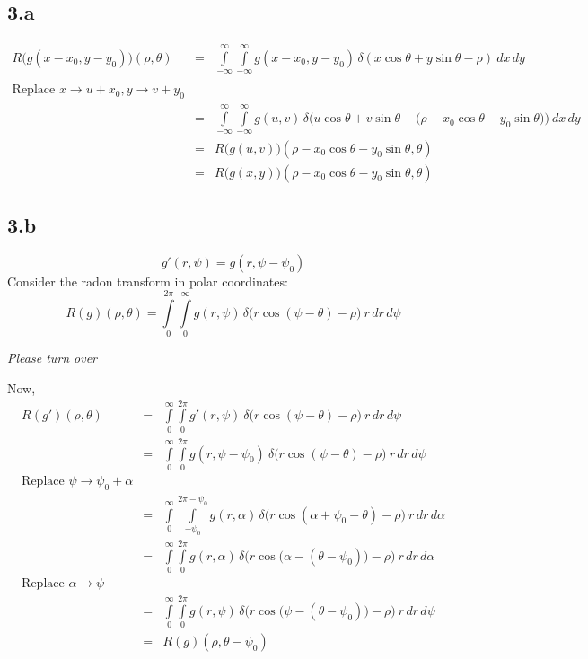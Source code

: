 \documentclass[12pt]{article}
\begin{document}
\subsection*{3.a}
\begin{eqnarray*}
	R\big(g(x-x_0, y-y_0)\big)(\rho, \theta) &=& \int\limits_{-\infty}^\infty \int \limits_{-\infty}^\infty g(x-x_0, y-y_0)\,\delta(x \cos\theta  + y \sin \theta - \rho)\: dx\,dy\\\\
	\text{Replace } x \rightarrow u+x_0, y \rightarrow v+y_0&&\\
	&=& \int\limits_{-\infty}^\infty \int \limits_{-\infty}^\infty g(u, v)\, \delta\bigg(u\cos \theta + v \sin\theta - \big(\rho - x_0\cos\theta - y_0\sin\theta\big)\bigg)\: dx\,dy\\
	&=& R\big(g(u, v)\big)(\rho - x_0\cos\theta - y_0\sin\theta, \theta)\\
	&=& R\big(g(x, y)\big)(\rho - x_0\cos\theta - y_0\sin\theta, \theta)
\end{eqnarray*}

\subsection*{3.b}
$$g'(r, \psi) = g(r, \psi - \psi_0)$$
Consider the radon transform in polar coordinates:
$$R(g)(\rho, \theta) = \int \limits_{0}^{2\pi} \int \limits_{0}^\infty g(r, \psi)\, \delta\bigg(r\cos(\psi-\theta) - \rho\bigg)\: r\,dr\,d\psi$$
\vspace{4cm}
\begin{center}
	\textit{Please turn over}
\end{center}

Now, 
\begin{eqnarray*}
	R(g')(\rho, \theta) &=& \int \limits_{0}^\infty \int \limits_{0}^{2\pi} g'(r, \psi) \: \delta\bigg(r \cos(\psi - \theta) - \rho\bigg) \: r\, dr\, d\psi\\
	&=& \int \limits_{0}^\infty \int \limits_{0}^{2\pi} g(r, \psi - \psi_0) \: \delta\bigg(r \cos(\psi  - \theta) - \rho\bigg) \: r\, dr\, d\psi\\
	\text{Replace }\psi \rightarrow \psi_0 + \alpha &&\\
	&=& \int \limits_0^\infty \int \limits_{-\psi_0}^{2\pi-\psi_0}g(r, \alpha)\, \delta\bigg(r \cos(\alpha + \psi_0 - \theta) - \rho\bigg) \: r\,dr\,d\alpha\\
	&=& \int \limits_0^\infty \int \limits_{0}^{2\pi} g(r, \alpha)\, \delta\bigg(r \cos \big(\alpha - (\theta - \psi_0)\big) - \rho\bigg)\: r \,dr\,d\alpha\\
	\text{Replace } \alpha \rightarrow \psi&&\\
	&=&	\int \limits_0^\infty \int \limits_{0}^{2\pi} g(r, \psi)\, \delta\bigg(r \cos \big(\psi - (\theta - \psi_0)\big) - \rho\bigg)\: r \,dr\,d\psi\\
	&=& R(g)(\rho, \theta - \psi_0)
\end{eqnarray*}
\end{document}
